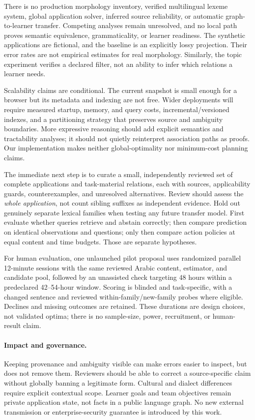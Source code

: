\documentclass{article}
\begin{document}
There is no production morphology inventory, verified multilingual lexeme system, global application solver, inferred source reliability, or automatic graph-to-learner transfer. Competing analyses remain unresolved, and no local path proves semantic equivalence, grammaticality, or learner readiness. The synthetic applications are fictional, and the baseline is an explicitly lossy projection. Their error rates are not empirical estimates for real morphology. Similarly, the topic experiment verifies a declared filter, not an ability to infer which relations a learner needs.

Scalability claims are conditional. The current snapshot is small enough for a browser but its metadata and indexing are not free. Wider deployments will require measured startup, memory, and query costs, incremental/versioned indexes, and a partitioning strategy that preserves source and ambiguity boundaries. More expressive reasoning should add explicit semantics and tractability analyses; it should not quietly reinterpret association paths as proofs. Our implementation makes neither global-optimality nor minimum-cost planning claims.

The immediate next step is to curate a small, independently reviewed set of complete applications and task-material relations, each with sources, applicability guards, counterexamples, and unresolved alternatives. Review should assess the \emph{whole application}, not count sibling suffixes as independent evidence. Hold out genuinely separate lexical families when testing any future transfer model. First evaluate whether queries retrieve and abstain correctly; then compare prediction on identical observations and questions; only then compare action policies at equal content and time budgets. Those are separate hypotheses.

For human evaluation, one unlaunched pilot proposal uses randomized parallel 12-minute sessions with the same reviewed Arabic content, estimator, and candidate pool, followed by an unassisted check targeting 48 hours within a predeclared 42--54-hour window. Scoring is blinded and task-specific, with a changed sentence and reviewed within-family/new-family probes where eligible. Declines and missing outcomes are retained. These durations are design choices, not validated optima; there is no sample-size, power, recruitment, or human-result claim.

\paragraph{Impact and governance.}
Keeping provenance and ambiguity visible can make errors easier to inspect, but does not remove them. Reviewers should be able to correct a source-specific claim without globally banning a legitimate form. Cultural and dialect differences require explicit contextual scope. Learner goals and team objectives remain private application state, not facts in a public language graph. No new external transmission or enterprise-security guarantee is introduced by this work.
\end{document}

